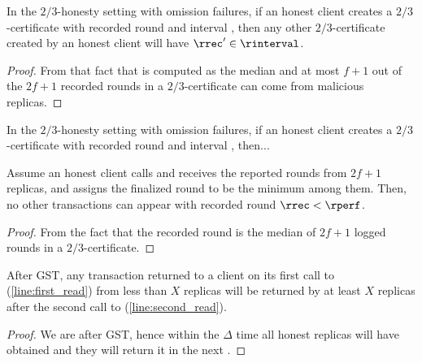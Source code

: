 \begin{lemma}
    In the $2/3$-honesty setting with omission failures,
    if an honest client creates a $2/3$-certificate with recorded round \rrec and interval \rinterval,
    then any other $2/3$-certificate created by an honest client will have $\rrec' \in \rinterval$.
\end{lemma}
\begin{proof}
    From that fact that \rrec is computed as the median and at most $f+1$ out of the $2f+1$ recorded
    rounds in a $2/3$-certificate can come from malicious replicas.
\end{proof}


\begin{lemma}
    In the $2/3$-honesty setting with omission failures,
    if an honest client creates a $2/3$-certificate with recorded round \rrec and interval \rinterval,
    then... 
\end{lemma}


\begin{lemma}\label{lem:recorded_round_smaller_perfect}
    Assume an honest client calls \opreadall{} and receives the reported rounds from $2f+1$ replicas,
    and assigns the finalized round \rperf to be the minimum among them.
    Then, no other transactions can appear with recorded round $\rrec < \rperf$.
\end{lemma}
\begin{proof}
    From the fact that the recorded round is the median of $2f+1$ logged rounds in a $2/3$-certificate.
\end{proof}


\begin{lemma}\label{lem:first-read-confirmed-second}
    After GST, any transaction \tx returned to a client on its first call to \opread{} (\cref{line:first_read}) from
    less than $X$ replicas  will be returned by at least $X$ replicas after the 
    second call to \opread{} (\cref{line:second_read}).
\end{lemma}
\begin{proof}
    We are after GST, hence within the $\Delta$ time all honest replicas will have obtained \tx
    and they will return it in the next \opread{}.
\end{proof}


